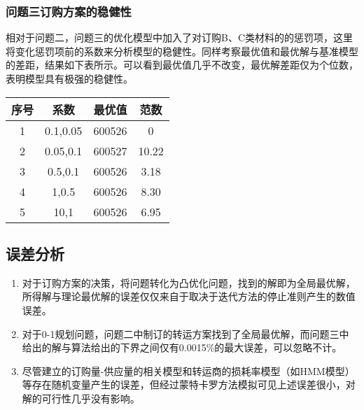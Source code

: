 \documentclass{my_paper}
\begin{document}
\subsubsection{问题三订购方案的稳健性}
相对于问题二，问题三的优化模型中加入了对订购B、C类材料的的惩罚项，这里将变化惩罚项前的系数来分析模型的稳健性。同样考察最优值和最优解与基准模型的差距，结果如下表所示。可以看到最优值几乎不改变，最优解差距仅为个位数，表明模型具有极强的稳健性。
\begin{table}[h]
    \centering
\begin{tabular}{cccc}
	
	序号&系数&最优值& 范数 \\
	\hline\hline
	1&0.1,0.05&600526& 0\\
	\hline
	2&0.05,0.1&600527& 10.22\\
	\hline
	3&0.5,0.1&600526& 3.18\\
	\hline
	4&1,0.5&600526& 8.30\\
	\hline
	5&10,1&600526& 6.95\\
	\hline
\end{tabular}
\end{table}

\subsection{误差分析}

\begin{enumerate}

\item 对于订购方案的决策，将问题转化为凸优化问题，找到的解即为全局最优解，所得解与理论最优解的误差仅仅来自于取决于迭代方法的停止准则产生的数值误差。

\item 对于0-1规划问题，问题二中制订的转运方案找到了全局最优解，而问题三中给出的解与算法给出的下界之间仅有0.0015\%的最大误差，可以忽略不计。

\item 尽管建立的订购量-供应量的相关模型和转运商的损耗率模型（如HMM模型）等存在随机变量产生的误差，但经过蒙特卡罗方法模拟可见上述误差很小，对解的可行性几乎没有影响。

\end{enumerate}

\iffalse
模型的分析与检验的内容也可以放到模型的建立与求解部分，这里我们单独抽出来进行讲解，因为这部分往往是论文的加分项，很多优秀论文也会单独抽出一节来对这个内容进行讨论。
模型的分析 ：在建模比赛中模型分析主要有两种，一个是灵敏度(性)分析，另一个是误差分析。灵敏度分析是研究与分析一个系统（或模型）的状态或输出变化对系统参数或周围条件变化的敏感程度的方法。其通用的步骤是：控制其他参数不变的情况下，改变模型中某个重要参数的值，然后观察模型的结果的变化情况。误差分析是指分析模型中的误差来源，或者估算模型中存在的误差，一般用于预测问题或者数值计算类问题。
模型的检验：模型检验可以分为两种，一种是使用模型之前应该进行的检验，例如层次分析法中一致性检验，灰色预测中的准指数规律的检验，这部分内容应该放在模型的建立部分；另一种是使用了模型后对模型的结果进行检验，数模中最常见的是稳定性检验，实际上这里的稳定性检验和前面的灵敏度分析非常类似。
\fi
\end{document}
